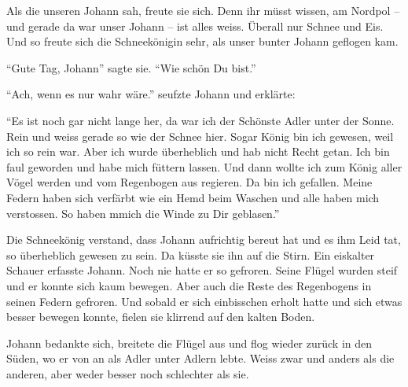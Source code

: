 Als die unseren Johann sah, freute sie sich. Denn ihr müsst wissen, am Nordpol -- und gerade da war unser Johann -- ist alles weiss. Überall nur Schnee und Eis. Und so freute sich die Schneekönigin sehr, als unser bunter Johann geflogen kam. 

\enquote{Gute Tag, Johann} sagte sie. \enquote{Wie schön Du bist.} 

\enquote{Ach, wenn es nur wahr wäre.} seufzte Johann und erklärte: 

\enquote{Es ist noch gar nicht lange her, da war ich der Schönste Adler unter der Sonne. Rein und weiss gerade so wie der Schnee hier. Sogar König bin ich gewesen, weil ich so rein war. Aber ich wurde überheblich und hab nicht Recht getan. Ich bin faul geworden und habe mich füttern lassen. Und dann wollte ich zum König aller Vögel werden und vom Regenbogen aus regieren. Da bin ich gefallen. Meine Federn haben sich verfärbt wie ein Hemd beim Waschen und alle haben mich verstossen. So haben mmich die Winde zu Dir geblasen.}

Die Schneekönig verstand, dass Johann aufrichtig bereut hat und es ihm Leid tat, so überheblich gewesen zu sein. Da küsste sie ihn auf die Stirn. Ein eiskalter Schauer erfasste Johann. Noch nie hatte er so gefroren. Seine Flügel wurden steif und er konnte sich kaum bewegen. Aber auch die Reste des Regenbogens in seinen Federn gefroren. Und sobald er sich einbisschen erholt hatte und sich etwas besser bewegen konnte, fielen sie klirrend auf den kalten Boden.

Johann bedankte sich, breitete die Flügel aus und flog wieder zurück in den Süden, wo er von an als Adler unter Adlern lebte. Weiss zwar und anders als die anderen, aber weder besser noch schlechter als sie.
